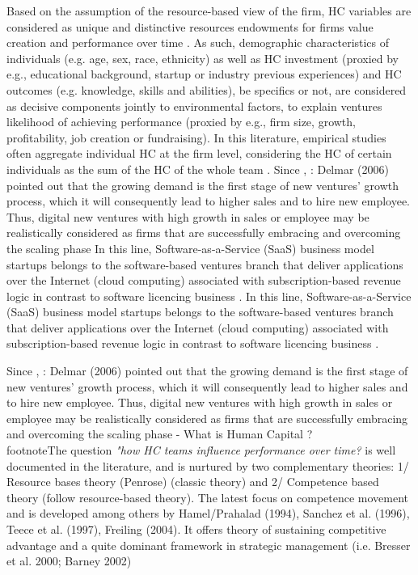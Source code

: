 Based on the assumption of the resource-based view of the firm, HC variables are considered as unique and distinctive resources endowments for firms value creation and performance over time \citep{penrose1956theory, becker1964human}. As such, demographic characteristics of individuals (e.g. age, sex, race, ethnicity) as well as HC investment (proxied by e.g., educational background, startup or industry previous experiences) and HC outcomes (e.g. knowledge, skills and abilities), be specifics or not, are considered as decisive components jointly to environmental factors, to explain ventures likelihood of achieving performance (proxied by e.g., firm size, growth, profitability, job creation or fundraising). In this literature, empirical studies often aggregate individual HC at the firm level, considering the HC of certain individuals as the sum of the HC of the whole team \citep{marvel2016human}.
Since \citet{cavallo2019fostering}, : Delmar (2006) pointed out that the growing demand is the first stage of new ventures' growth process, which it will consequently lead to higher sales and to hire new employee. Thus, digital new ventures with high growth in sales or employee may be realistically considered as firms that are successfully embracing and overcoming the scaling phase
In this line, Software-as-a-Service (SaaS) business model startups belongs to the software-based ventures branch that deliver applications over the Internet (cloud computing) associated with subscription-based revenue logic in contrast to software licencing business \citet{luoma2018exploring}.
In this line, Software-as-a-Service (SaaS) business model startups belongs to the software-based ventures branch that deliver applications over the Internet (cloud computing) associated with subscription-based revenue logic in contrast to software licencing business \citet{luoma2018exploring}.

Since \citet{cavallo2019fostering}, : Delmar (2006) pointed out that the growing demand is the first stage of new ventures' growth process, which it will consequently lead to higher sales and to hire new employee. Thus, digital new ventures with high growth in sales or employee may be realistically considered as firms that are successfully embracing and overcoming the scaling phase
- What is Human Capital ?\\

footnote{The question \textit{"how HC teams influence performance over time?} is well documented in the literature, and is nurtured by two complementary theories: 1/ Resource bases theory (Penrose) (classic theory) and 2/ Competence based theory (follow resource-based theory). The latest focus on competence movement and is developed among others by Hamel/Prahalad (1994), Sanchez et al. (1996), Teece et al. (1997), Freiling (2004). It offers theory of sustaining competitive advantage and a quite dominant framework in strategic management (i.e. Bresser et al. 2000; Barney 2002)}


